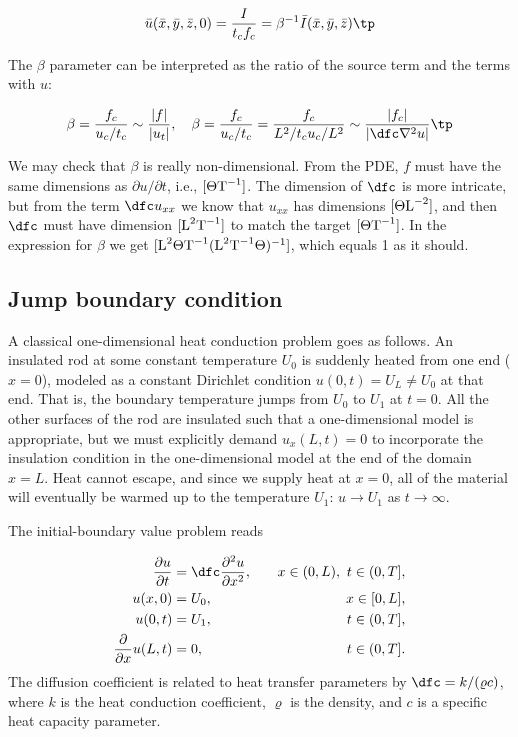\documentclass[graybox,envcountchap,sectrefs,final]{svmonodo}
\begin{document}
\[ \bar u(\bar x, \bar y, \bar z, 0) = \frac{I}{t_cf_c} =
\beta^{-1}\bar I(\bar x,\bar y,\bar z)\tp
\]

The $\beta$ parameter can be interpreted as the ratio of the source
term and the terms with $u$:

\[ \beta = \frac{f_c}{u_c/t_c}\sim \frac{|f|}{|u_t|},\quad
\beta = \frac{f_c}{u_c/t_c} = \frac{f_c}{L^2/t_c u_c/L^2}\sim
\frac{|f_c|}{|\dfc\nabla^2 u|}\tp
\]

We may check that $\beta$ is really non-dimensional. From the PDE,
$f$ must have the same dimensions as $\partial u/\partial t$, i.e.,
$[\Theta\hbox{T}^{-1}]$.
The dimension of $\dfc$ is more intricate, but from the term
$\dfc u_{xx}$ we know that $u_{xx}$ has dimensions $[\Theta\hbox{L}^{-2}]$,
and then $\dfc$ must have dimension $[\hbox{L}^2\hbox{T}^{-1}]$
to match the target $[\Theta\hbox{T}^{-1}]$.
In the expression for $\beta$ we get
$[\hbox{L}^2\Theta\hbox{T}^{-1}(\hbox{L}^2\hbox{T}^{-1}\Theta)^{-1}]$,
which equals 1 as it should.


\subsection{Jump boundary condition}

A classical one-dimensional heat conduction problem goes as
follows. An insulated rod at some constant temperature $U_0$ is
suddenly heated from one end ($x=0$), modeled as a constant Dirichlet
condition $u(0,t)=U_L\neq U_0$ at that end. That is, the boundary
temperature jumps from $U_0$ to $U_1$ at $t=0$. All the other surfaces
of the rod are insulated such that a one-dimensional model is
appropriate, but we must explicitly demand $u_x(L,t)=0$ to incorporate
the insulation condition in the one-dimensional model at the end
of the domain $x=L$.  Heat cannot
escape, and since we supply heat at $x=0$, all of the material will
eventually be warmed up to the temperature $U_1$: $u\rightarrow U_1$
as $t\rightarrow\infty$.

The initial-boundary value problem reads

\begin{align}
\frac{\partial u}{\partial t} &=
\dfc \frac{\partial^2 u}{\partial x^2},
\quad &  x\in (0,L),\ t\in (0, T],
\label{scale:heat:pde3}\\ 
u(x,0) &= U_0,
\quad & x\in [0,L],
\label{scale:heat:pde3:ic:u}\\ 
u(0, t) & = U_1,
\quad  & t\in (0, T],
\label{scale:heat:pde3:bc:0}\\ 
\frac{\partial}{\partial x} u(L, t) & = 0,
\quad & t\in (0, T].
\label{scale:heat:pde3:bc:L}
\end{align}
The diffusion coefficient is related to heat transfer parameters
by $\dfc = k/(\varrho c)$, where $k$ is the heat conduction coefficient,
$\varrho$ is the density, and $c$ is a specific heat capacity parameter.
\end{document}
